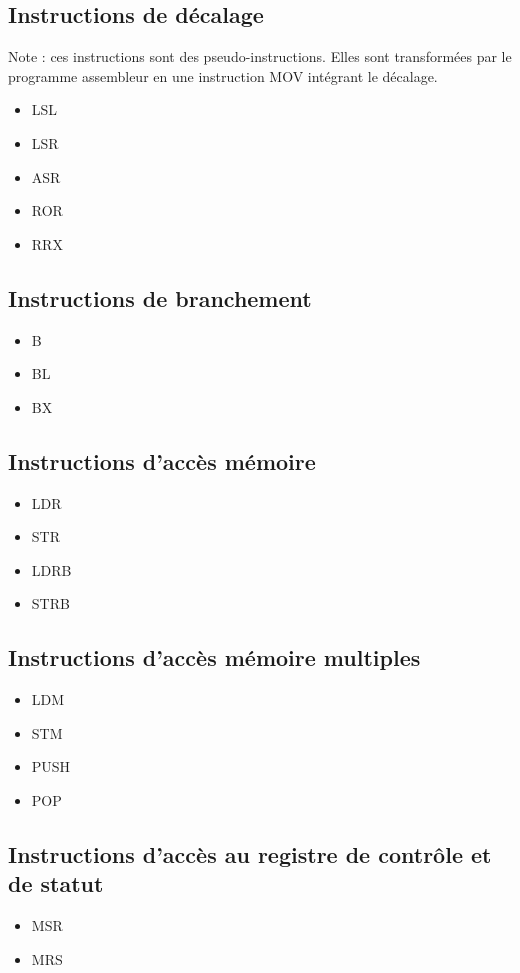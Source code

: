 \documentclass{tufte-handout}
\begin{document}
\subsection{Instructions de décalage}
Note : ces instructions sont des pseudo-instructions. Elles sont transformées par le programme assembleur en une instruction MOV intégrant le décalage.
\begin{itemize}
	\item LSL
	\item LSR
	\item ASR
	\item ROR
	\item RRX
\end{itemize}

\subsection{Instructions de branchement}
\begin{itemize}
	\item B
	\item BL
	\item BX
\end{itemize}

\subsection{Instructions d'accès mémoire}
\begin{itemize}
	\item LDR
	\item STR
	\item LDRB
	\item STRB
\end{itemize}

\subsection{Instructions d'accès mémoire multiples}
\begin{itemize}
	\item LDM
	\item STM
	\item PUSH
	\item POP
\end{itemize}

\subsection{Instructions d'accès au registre de contrôle et de statut}
\begin{itemize}
	\item MSR
	\item MRS
\end{itemize}
\end{document}
